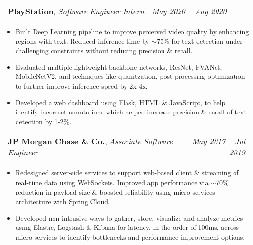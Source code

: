\documentclass[letterpaper,10pt]{article}
\makeatletter
\newcommand{\resumeItem}[2]{
	\item\normalsize{
		\textbf{#1}{: #2}
	}\vspace{-2pt}
}
\newcommand{\resumeSubheading}[4]{
	\vspace{2pt}\item[]
	\begin{tabular*}{\textwidth}[t]{l@{\extracolsep{\fill}}r}
		\textbf{#1}, \textit{\small#3} \textit{\small#2} & \textit{\small #4} \\
	\end{tabular*}\vspace{-4pt}
}
\newcommand{\resumeSubHeadingListStart}{\begin{itemize}[leftmargin=\hoffset]}
\newcommand{\resumeSubHeadingListEnd}{\end{itemize}}
\makeatother
\begin{document}
		\resumeSubheading
	{PlayStation}{}
	{Software Engineer Intern}{May 2020 -- Aug 2020}
	\resumeSubHeadingListStart
	\item{Built Deep Learning pipeline to improve perceived video quality by enhancing regions with text. Reduced inference time by $\sim$75\% for text detection under challenging constraints without reducing precision \& recall.}
	\item{Evaluated multiple lightweight backbone networks, ResNet, PVANet, MobileNetV2, and techniques like quanitzation, post-processing optimization to further improve inference speed by 2x-4x.}
	\item{Developed a web dashboard using Flask, HTML \& JavaScript, to help identify incorrect annotations which helped increase precision \& recall of text detection by 1-2\%.}
	\vspace{-2mm}
	\resumeSubHeadingListEnd
	
	\resumeSubheading
	{JP Morgan Chase \& Co.}{}
	{Associate Software Engineer}{May 2017 -- Jul 2019}
	\resumeSubHeadingListStart
	\item{Redesigned server-side services to support web-based client \& streaming of real-time data using WebSockets. Improved app performance via $\sim$70\%  reduction in payload size \& boosted reliability using micro-services architecture with Spring Cloud.}
	\item{Developed non-intrusive ways to gather, store, visualize and analyze metrics using Elastic, Logstash \& Kibana for latency, in the order of 100ms, across micro-services to identify bottlenecks and performance improvement options.}
	\vspace{-2mm}
	\resumeSubHeadingListEnd
	
\end{document}
